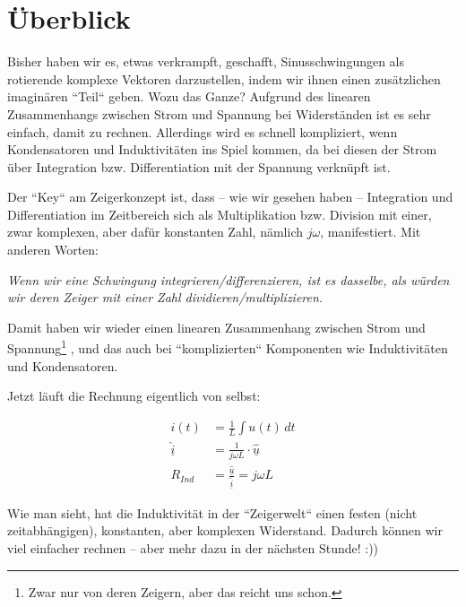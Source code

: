 \documentclass[11pt,a4paper]{article}
\begin{document}
\section{Überblick}

Bisher haben wir es, etwas verkrampft, geschafft, Sinusschwingungen als rotierende komplexe Vektoren darzustellen, indem wir ihnen einen zusätzlichen imaginären ``Teil`` geben. Wozu das Ganze? Aufgrund des linearen Zusammenhangs zwischen Strom und Spannung bei Widerständen ist es sehr einfach, damit zu rechnen. Allerdings wird es schnell kompliziert, wenn Kondensatoren und Induktivitäten ins Spiel kommen, da bei diesen der Strom über Integration bzw. Differentiation mit der Spannung verknüpft ist.

Der ``Key`` am Zeigerkonzept ist, dass – wie wir gesehen haben – Integration und Differentiation im Zeitbereich sich als Multiplikation bzw. Division mit einer, zwar komplexen, aber dafür konstanten Zahl, nämlich \(j\omega\), manifestiert. Mit anderen Worten: \\

\begin{center}
\textit{Wenn wir eine Schwingung integrieren/differenzieren, ist es dasselbe, als würden wir deren Zeiger mit einer Zahl dividieren/multiplizieren.}\\
\end{center}





Damit haben wir wieder einen linearen Zusammenhang zwischen Strom und Spannung\footnote{Zwar nur von deren Zeigern, aber das reicht uns schon.}
, und das auch bei ``komplizierten`` Komponenten wie Induktivitäten und Kondensatoren.  

Jetzt läuft die Rechnung eigentlich von selbst:

\[
\begin{aligned}
i(t) &= \frac{1}{L} \int u(t) \, dt \\
\underline{\hat{i}} &= \frac{1}{j\omega L}\cdot \underline{\hat{u}} \\
R_{Ind} &= \frac{\underline{\hat{u}}}{\underline{\hat{i}}} = j\omega L
\end{aligned}
\]

Wie man sieht, hat die Induktivität in der ``Zeigerwelt`` einen festen (nicht zeitabhängigen), konstanten, aber komplexen Widerstand. Dadurch können wir viel einfacher rechnen – aber mehr dazu in der nächsten Stunde! :))
\end{document}
